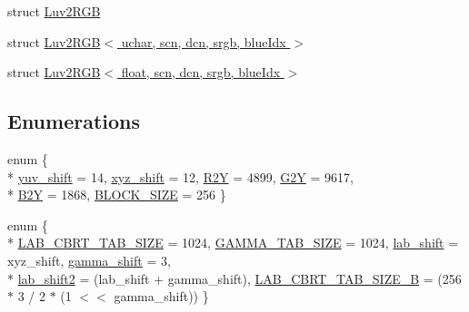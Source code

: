 \begin{DoxyCompactItemize}
\item 
struct \hyperlink{structcv_1_1gpu_1_1device_1_1color__detail_1_1Luv2RGB}{Luv2\-R\-G\-B}
\item 
struct \hyperlink{structcv_1_1gpu_1_1device_1_1color__detail_1_1Luv2RGB_3_01uchar_00_01scn_00_01dcn_00_01srgb_00_01blueIdx_01_4}{Luv2\-R\-G\-B$<$ uchar, scn, dcn, srgb, blue\-Idx $>$}
\item 
struct \hyperlink{structcv_1_1gpu_1_1device_1_1color__detail_1_1Luv2RGB_3_01float_00_01scn_00_01dcn_00_01srgb_00_01blueIdx_01_4}{Luv2\-R\-G\-B$<$ float, scn, dcn, srgb, blue\-Idx $>$}
\end{DoxyCompactItemize}
\subsection*{Enumerations}
\begin{DoxyCompactItemize}
\item 
enum \{ \\*
\hyperlink{namespacecv_1_1gpu_1_1device_1_1color__detail_ae58c078ca311bfd585ee671e5be8ae7ea1a7cb0ff2d3a2a1b53c5d5c13532ed0b}{yuv\-\_\-shift} = 14, 
\hyperlink{namespacecv_1_1gpu_1_1device_1_1color__detail_ae58c078ca311bfd585ee671e5be8ae7ea1bc1de396e04ee0ae780e6abf3333b96}{xyz\-\_\-shift} = 12, 
\hyperlink{namespacecv_1_1gpu_1_1device_1_1color__detail_ae58c078ca311bfd585ee671e5be8ae7ead9cfd5ce6f8a65d50a1009d31ec5b27f}{R2\-Y} = 4899, 
\hyperlink{namespacecv_1_1gpu_1_1device_1_1color__detail_ae58c078ca311bfd585ee671e5be8ae7eaa29ed213682a1a97cc5fcc96decf0ad7}{G2\-Y} = 9617, 
\\*
\hyperlink{namespacecv_1_1gpu_1_1device_1_1color__detail_ae58c078ca311bfd585ee671e5be8ae7ea012d3fbd135db816dc4aa715157d30e9}{B2\-Y} = 1868, 
\hyperlink{namespacecv_1_1gpu_1_1device_1_1color__detail_ae58c078ca311bfd585ee671e5be8ae7eaca9d98d005c3c383a0ee13ce5216d3a7}{B\-L\-O\-C\-K\-\_\-\-S\-I\-Z\-E} = 256
 \}
\item 
enum \{ \\*
\hyperlink{namespacecv_1_1gpu_1_1device_1_1color__detail_a8c3383c17054865e99a1699739d0bebfa2dc628dce0e7f0f57233fbe7a778565a}{L\-A\-B\-\_\-\-C\-B\-R\-T\-\_\-\-T\-A\-B\-\_\-\-S\-I\-Z\-E} = 1024, 
\hyperlink{namespacecv_1_1gpu_1_1device_1_1color__detail_a8c3383c17054865e99a1699739d0bebfa1c2aec3bf79d4a5a07f2f60fab51d0bd}{G\-A\-M\-M\-A\-\_\-\-T\-A\-B\-\_\-\-S\-I\-Z\-E} = 1024, 
\hyperlink{namespacecv_1_1gpu_1_1device_1_1color__detail_a8c3383c17054865e99a1699739d0bebfad9138755a16ba23f7f4884923248040c}{lab\-\_\-shift} = xyz\-\_\-shift, 
\hyperlink{namespacecv_1_1gpu_1_1device_1_1color__detail_a8c3383c17054865e99a1699739d0bebfaadd3b911eb0e46dbe4cdd48489bfcd81}{gamma\-\_\-shift} = 3, 
\\*
\hyperlink{namespacecv_1_1gpu_1_1device_1_1color__detail_a8c3383c17054865e99a1699739d0bebfa1a6c9ec0db0f616c7b9d05c0a92d0601}{lab\-\_\-shift2} = (lab\-\_\-shift + gamma\-\_\-shift), 
\hyperlink{namespacecv_1_1gpu_1_1device_1_1color__detail_a8c3383c17054865e99a1699739d0bebfa13b94e40f3f2d016c6c70702db8800af}{L\-A\-B\-\_\-\-C\-B\-R\-T\-\_\-\-T\-A\-B\-\_\-\-S\-I\-Z\-E\-\_\-\-B} = (256 $\ast$ 3 / 2 $\ast$ (1 $<$$<$ gamma\-\_\-shift))
 \}
\end{DoxyCompactItemize}
